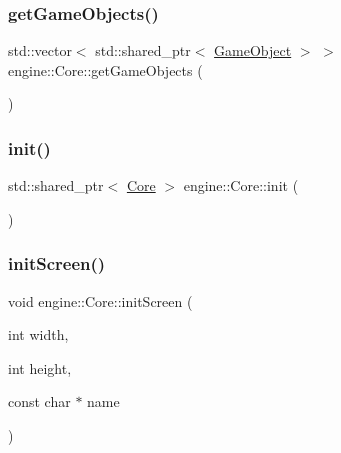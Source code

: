 \mbox{\label{classengine_1_1_core_a2adaa238c7ad9d6a3ce461f0010ef71b}} 
\subsubsection{\texorpdfstring{get\+Game\+Objects()}{getGameObjects()}}
{\footnotesize\ttfamily std\+::vector$<$ std\+::shared\+\_\+ptr$<$ \mbox{\hyperlink{classengine_1_1_game_object}{Game\+Object}} $>$ $>$ engine\+::\+Core\+::get\+Game\+Objects (\begin{DoxyParamCaption}{ }\end{DoxyParamCaption})}

\mbox{\label{classengine_1_1_core_ac6e2aa4ca0251d90f187fe650f6e6e4f}} 
\subsubsection{\texorpdfstring{init()}{init()}}
{\footnotesize\ttfamily std\+::shared\+\_\+ptr$<$ \mbox{\hyperlink{classengine_1_1_core}{Core}} $>$ engine\+::\+Core\+::init (\begin{DoxyParamCaption}{ }\end{DoxyParamCaption})\hspace{0.3cm}{\ttfamily [static]}}

\mbox{\label{classengine_1_1_core_ae4f596a5326dea97c860171d6ffb6c7d}} 
\subsubsection{\texorpdfstring{init\+Screen()}{initScreen()}}
{\footnotesize\ttfamily void engine\+::\+Core\+::init\+Screen (\begin{DoxyParamCaption}\item[{int}]{width,  }\item[{int}]{height,  }\item[{const char $\ast$}]{name }\end{DoxyParamCaption})}

